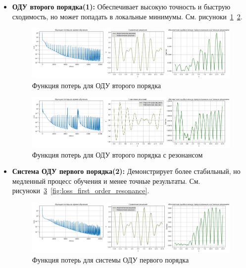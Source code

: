 \documentclass[12pt,a4paper]{article}
\begin{document}
\begin{itemize}
    \item \textbf{ОДУ второго порядка(1):} Обеспечивает высокую точность и быструю сходимость, но может попадать в локальные минимумы. См. рисуноки~\ref{fig:loss_second_order}~\ref{fig:loss_second_order_resonance}.

    \begin{figure}[h!]
        \centering
        \includegraphics[width=1\textwidth]{images/Loss&x_ODE_of_the_second_order.png}
        \caption{Функция потерь для ОДУ второго порядка}
        \label{fig:loss_second_order}
    \end{figure}

    \begin{figure}[h!]
        \centering
        \includegraphics[width=1\textwidth]{images/Loss&x_ODE_of_the_second_order_resonance.png}
        \caption{Функция потерь для ОДУ второго порядка с резонансом}
        \label{fig:loss_second_order_resonance}
    \end{figure}

    \item \textbf{Система ОДУ первого порядка(2):} Демонстрирует более стабильный, но медленный процесс обучения и менее точные результаты. См. рисуноки~\ref{fig:loss_first_order}~\ref{fig:loss_first_order_resonance}.
    
    \begin{figure}[h!]
        \centering
        \includegraphics[width=1\textwidth]{images/Loss&x_ODE_of_the_first_order.png}
        \caption{Функция потерь для системы ОДУ первого порядка}
        \label{fig:loss_first_order}
    \end{figure}


\end{itemize}
\end{document}
